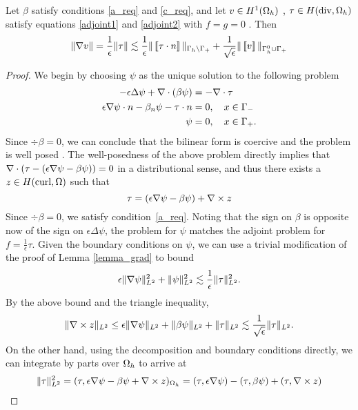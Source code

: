 \begin{lemma}
\label{lemma_boundary}
Let $\beta$ satisfy conditions \eqref{a_req} and \eqref{c_req}, and let $v \in H^1(\Oh)$ , $\tau \in H({\rm div},\Oh)$ satisfy equations \eqref{adjoint1} and \eqref{adjoint2} with $f=g=0$%
. Then
\[
\|\grad v\| = \frac{1}{\epsilon}\|\tau\| \lesssim \frac{1}{\epsilon} \| \jump{\tau\cdot n}\|_{\Gh \setminus \Gamma_+} + \frac{1}{\sqrt{\epsilon}} \| \jump{v}\|_{\Gh^0 \cup \Gamma_+}
\]
\end{lemma}
\begin{proof}

We begin by choosing $\psi$ as the unique solution to the following problem
\begin{align*}
-\epsilon \Delta \psi + \div \left(\beta \psi\right) &= -\div \tau \\
\epsilon \grad \psi \cdot n - \beta_n\psi - \tau\cdot n &= 0, \quad x\in \Gamma_-\\
\psi &= 0, \quad x\in \Gamma_+.
\end{align*}
Since $\div \beta = 0$, we can conclude that the bilinear form is coercive and the problem is well posed \cite{DPGrobustness}. The well-posedness of the above problem directly implies that $\div \left(\tau-(\epsilon\grad \psi - \beta \psi)\right) = 0$ in a distributional sense, and thus there exists a $z\in H({\rm curl},\Omega)$ such that
\[
\tau = \left(\epsilon \grad \psi - \beta \psi\right) + \curl z
\]
Since $\div \beta = 0$, we satisfy condition~\eqref{a_req}. Noting that the sign on $\beta$ is opposite now of the sign on $\epsilon \Delta \psi$, the problem for $\psi$ matches the adjoint problem \label{adjoint} for $f = \frac{1}{\epsilon}\tau$. Given the boundary conditions on $\psi$, we can use a trivial modification of the proof of Lemma \ref{lemma_grad} to bound
\[
\epsilon \|\grad \psi\|_{L^2}^2 + \|\psi \|_{L^2}^2 \lesssim \frac{1}{\epsilon}\|\tau\|_{L^2}^2.
\]
By the above bound and the triangle inequality, 
\[
\|\curl z \|_{L^2} \leq \epsilon \|\grad \psi\|_{L^2} + \|\beta \psi\|_{L^2} + \|\tau\|_{L^2} \lesssim \frac{1}{\sqrt{\epsilon}}\|\tau\|_{L^2}.
\]
On the other hand, using the decomposition and boundary conditions directly, we can integrate by parts over $\Oh$ to arrive at
\begin{align*}
\|\tau\|_{L^2}^2 &= (\tau, \epsilon \grad \psi - \beta \psi + \curl z)_{\Oh} = (\tau, \epsilon \grad \psi) - (\tau,\beta \psi) + (\tau,\curl z)  \\

\end{align*}
\end{proof}
